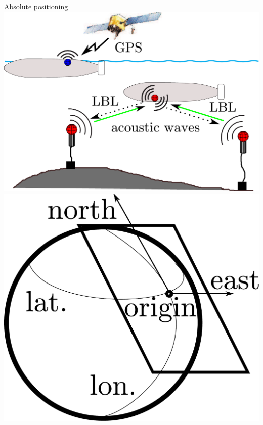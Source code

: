 \begin{frame}
\begin{columns}[t]
	\begin{block}{Absolute positioning}
	\centering
	\includegraphics[width=0.7\linewidth]{fig/lbl-gps.pdf}
	\includegraphics[width=0.28\linewidth]{fig/positioning.pdf}	
	\end{block}

\end{columns}

%	
\end{frame}
